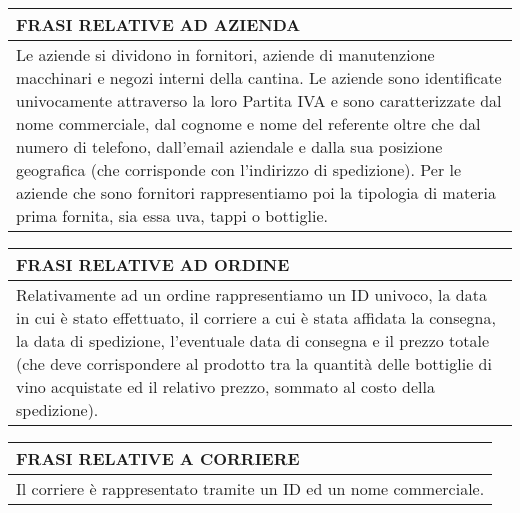 \begin{center}
	\begin{tabular}{P{16cm}}
		\toprule
		 \textbf {\large {FRASI RELATIVE AD AZIENDA}}                                                                                                                                                                                                                                                                                                                                                                                                                                                        \\
		\midrule
		Le aziende si dividono in fornitori, aziende di manutenzione macchinari e negozi interni della cantina. Le aziende sono identificate univocamente attraverso la loro Partita IVA e sono caratterizzate dal nome commerciale, dal cognome e nome del referente oltre che dal numero di telefono, dall'email aziendale e dalla sua posizione geografica (che corrisponde con l'indirizzo di spedizione). Per le aziende che sono fornitori rappresentiamo poi la tipologia di materia prima fornita, sia essa uva, tappi o bottiglie. \\
		\bottomrule
	\end{tabular}

	\vspace{0.5cm}

	\begin{tabular}{P{16cm}}
		\toprule
		 \textbf {\large {FRASI RELATIVE AD ORDINE}}                                                                                                                                                                                                                                                                                          \\
		\midrule
		Relativamente ad un ordine rappresentiamo un ID univoco, la data in cui è stato effettuato, il corriere a cui è stata affidata la consegna, la data di spedizione, l'eventuale data di consegna e il prezzo totale (che deve corrispondere al prodotto tra la quantità delle bottiglie di vino acquistate ed il relativo prezzo, sommato al costo della spedizione). \\
		\bottomrule
	\end{tabular}

	\vspace{0.5cm}

	\begin{tabular}{P{16cm}}
		\toprule
		 \textbf {\large {FRASI RELATIVE A CORRIERE}} \\
		\midrule
		Il corriere è rappresentato tramite un ID ed un nome commerciale.             \\
		\bottomrule
	\end{tabular}


\end{center}
